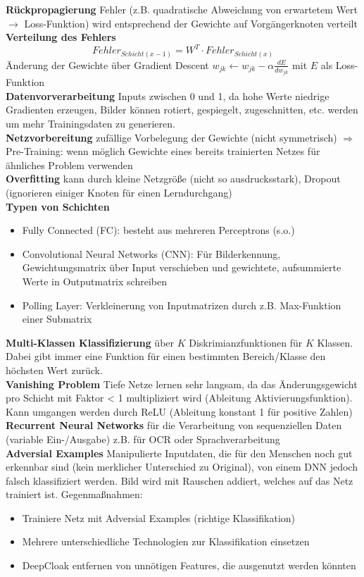 \documentclass[12pt]{article}
\begin{document}
	\textbf{Rückpropagierung} Fehler (z.B. quadratische Abweichung von erwartetem Wert $\rightarrow$ Loss-Funktion) wird entsprechend der Gewichte auf Vorgängerknoten verteilt\\
	\textbf{Verteilung des Fehlers}
	$$Fehler_{Schicht(x-1)} = W^T \cdot Fehler_{Schicht(x)}$$
	Änderung der Gewichte über Gradient Descent $w_{jk} \leftarrow w_{jk} - \alpha \frac{dE}{dw_{jk}}$ mit $E$ als Loss-Funktion\\
	\textbf{Datenvorverarbeitung} Inputs zwischen 0 und 1, da hohe Werte niedrige Gradienten erzeugen, Bilder können rotiert, gespiegelt, zugeschnitten, etc. werden um mehr Trainingsdaten zu generieren.\\
	\textbf{Netzvorbereitung} zufällige Vorbelegung der Gewichte (nicht symmetrisch) $\Rightarrow$ Pre-Training: wenn möglich Gewichte eines bereits trainierten Netzes für ähnliches Problem verwenden\\
	\textbf{Overfitting} kann durch kleine Netzgröße (nicht so ausdrucksstark), Dropout (ignorieren einiger Knoten für einen Lerndurchgang)\\
	\textbf{Typen von Schichten}
	\begin{itemize}
		\item Fully Connected (FC): besteht aus mehreren Perceptrons (s.o.)
		\item Convolutional Neural Networks (CNN): Für Bilderkennung, Gewichtungsmatrix über Input verschieben und gewichtete, aufsummierte Werte in Outputmatrix schreiben
		\item Polling Layer: Verkleinerung von Inputmatrizen durch z.B. Max-Funktion einer Submatrix
	\end{itemize}
	\textbf{Multi-Klassen Klassifizierung} über $K$ Diskrimianzfunktionen für $K$ Klassen. Dabei gibt immer eine Funktion für einen bestimmten Bereich/Klasse den höchsten Wert zurück.\\
	\textbf{Vanishing Problem} Tiefe Netze lernen sehr langsam, da das Änderungsgewicht pro Schicht mit Faktor < 1 multipliziert wird (Ableitung Aktivierungsfunktion). Kann umgangen werden durch ReLU (Ableitung konstant 1 für positive Zahlen)\\
	\textbf{Recurrent Neural Networks} für die Verarbeitung von sequenziellen Daten (variable Ein-/Ausgabe) z.B. für OCR oder Sprachverarbeitung\\
	\textbf{Adversial Examples} Manipulierte Inputdaten, die für den Menschen noch gut erkennbar sind (kein merklicher Unterschied zu Original), von einem DNN jedoch falsch klassifiziert werden. Bild wird mit Rauschen addiert, welches auf das Netz trainiert ist. Gegenmaßnahmen:
	\begin{itemize}
		\item Trainiere Netz mit Adversial Examples (richtige Klassifikation)
		\item Mehrere unterschiedliche Technologien zur Klassifikation einsetzen
		\item DeepCloak entfernen von unnötigen Features, die ausgenutzt werden könnten
	\end{itemize}
	
\end{document}
